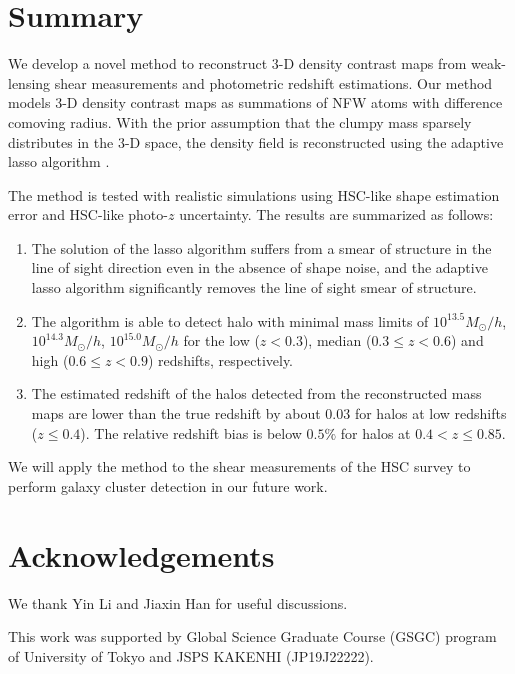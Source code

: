 \documentclass[twocolumn]{aastex62}
\begin{document}
\section{Summary}
\label{sec:Sum}

We develop a novel method to reconstruct $3$-D density contrast maps from
weak-lensing shear measurements and photometric redshift estimations.  Our
method models $3$-D density contrast maps as summations of NFW atoms with
difference comoving radius.  With the prior assumption that the clumpy mass
sparsely distributes in the $3$-D space, the density field is reconstructed
using the adaptive lasso algorithm \citep{AdaLASSO-Zou2006}.

The method is tested with realistic simulations using HSC-like shape estimation
error and HSC-like photo-$z$ uncertainty. The results are summarized as follows:
\begin{enumerate}
 \item The solution of the lasso algorithm suffers from a smear of structure in
     the line of sight direction even in the absence of shape noise, and the
     adaptive lasso algorithm significantly removes the line of sight smear of
     structure.
 \item The algorithm is able to detect halo with minimal mass
     limits of $10^{13.5} M_{\odot}/h$, $10^{14.3} M_{\odot}/h$, $10^{15.0}
     M_{\odot}/h$ for the low ($z<0.3$), median ($0.3\leq z< 0.6$) and high
     ($0.6\leq z< 0.9$) redshifts, respectively.
 \item The estimated redshift
     of the halos detected from the reconstructed mass maps are lower than the
     true redshift by about $0.03$ for halos at low redshifts ($z\leq 0.4$).
     The relative redshift bias is below $0.5\%$ for halos at $0.4<z\leq 0.85$.
\end{enumerate}

We will apply the method to the shear measurements of the HSC survey
\citep{HSC1-catalog,FPFSHSC1-Li2020} to perform galaxy cluster detection in our
future work.


\section*{Acknowledgements}
We thank Yin Li and Jiaxin Han for useful discussions.

This work was supported by Global Science Graduate Course (GSGC) program of
University of Tokyo and JSPS KAKENHI (JP19J22222).


\end{document}
